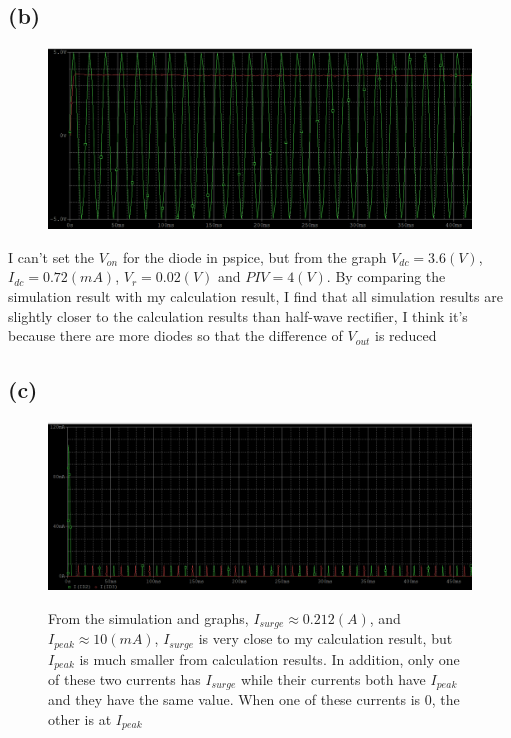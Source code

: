 \documentclass[12pt]{article}
\begin{document}
\subsection{(b)}
\begin{figure}[H]
\centering
\includegraphics[scale=0.3]{P3.png}
\end{figure}
I can't set the $V_{on}$ for the diode in pspice, but from the graph $V_{dc}=3.6(V)$, $I_{dc}=0.72(mA)$, $V_r=0.02(V)$ and $PIV=4(V)$. By comparing the simulation result with my calculation result, I find that all simulation results are slightly closer to the calculation results than half-wave rectifier, I think it's because there are more diodes so that the difference of $V_{out}$ is reduced
\subsection{(c)}
\begin{figure}[H]
\centering
\includegraphics[scale=0.3]{P4.png}
\par From the simulation and graphs, $I_{surge}\approx 0.212(A)$, and $I_{peak} \approx 10(mA)$,
$I_{surge}$ is very close to my calculation result, but $I_{peak}$ is much smaller from calculation results. In addition, only one of these two currents has $I_{surge}$ while their currents both have $I_{peak}$ and they have the same value. When one of these currents is 0, the other is at $I_{peak}$
\end{figure}
\end{document}
